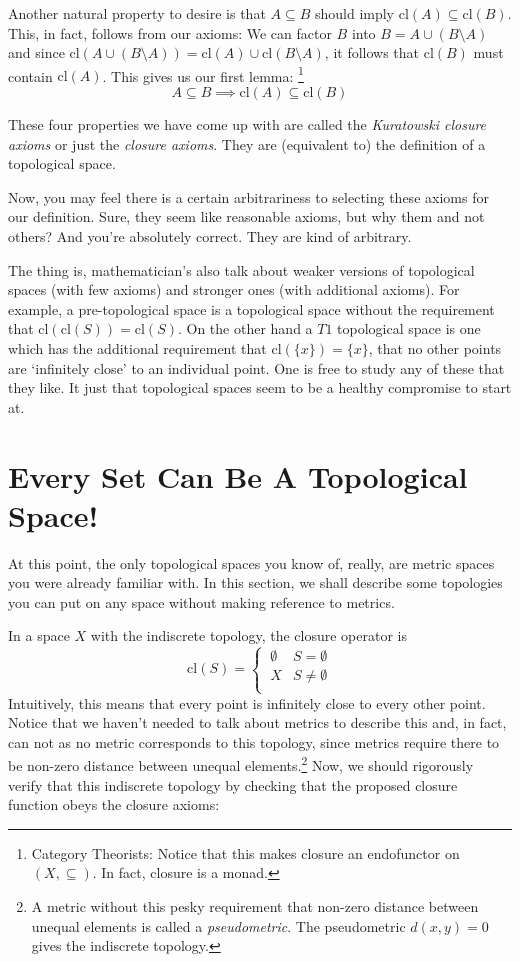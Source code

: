 \documentclass{report}
\newcommand{\cl}{\mathrm{cl}}
\begin{document}
Another natural property to desire is that $A ⊆ B$ should imply $\cl(A) ⊆ \cl(B)$. This, in fact, follows from our axioms: We can factor $B$ into $B = A∪(B\setminus A)$ and since $\cl(A∪(B\setminus A)) = \cl(A)∪\cl(B\setminus A)$, it follows that $\cl(B)$ must contain $\cl(A)$. This gives us our first lemma:
\footnote{Category Theorists: Notice that this makes closure an endofunctor on $(X, ⊆)$. In fact, closure is a monad.}
\begin{equation}
A ⊆ B   \implies   \cl(A) ⊆ \cl(B)   \tag{Lemma 1}
\end{equation}
  

These four properties we have come up with are called the \emph{Kuratowski closure axioms} or just the \emph{closure axioms}. They are (equivalent to) the definition of a topological space.

Now, you may feel there is a certain arbitrariness to selecting these axioms for our definition. Sure, they seem like reasonable axioms, but why them and not others? And you're absolutely correct. They are kind of arbitrary.

The thing is, mathematician's also talk about weaker versions of topological spaces (with few axioms) and stronger ones (with additional axioms). For example, a pre-topological space is a topological space without the requirement that $\cl(\cl(S)) = \cl(S)$. On the other hand a $T1$ topological space is one which has the additional requirement that $\cl(\{x\}) = \{x\}$, that no other points are `infinitely close' to an individual point. One is free to study any of these that they like. It just that topological spaces seem to be a healthy compromise to start at.

\section{Every Set Can Be A Topological Space!}

At this point, the only topological spaces you know of, really, are metric spaces you were already familiar with. In this section, we shall describe some topologies you can put on any space without making reference to metrics.

In a space $X$ with the indiscrete topology, the closure operator is $$\cl(S) = \begin{cases} ~∅ & S = ∅\\ ~X & S \neq ∅\\ \end{cases} $$ Intuitively, this means that every point is infinitely close to every other point. Notice that we haven't needed to talk about metrics to describe this and, in fact, can not as no metric corresponds to this topology, since metrics require there to be non-zero distance between unequal elements.\footnote{A metric without this pesky requirement that non-zero distance between unequal elements is called a \emph{pseudometric}. The pseudometric $d(x,y) = 0$ gives the indiscrete topology.} Now, we should rigorously verify that this indiscrete topology by checking that the proposed closure function obeys the closure axioms:
\end{document}
